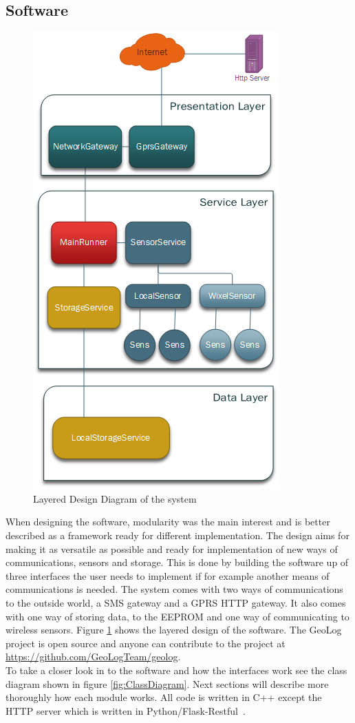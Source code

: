\subsection{Software}
\begin{figure}
\centering
\includegraphics[width=0.6\linewidth]{graphics/Layering}
\caption{Layered Design Diagram of the system\label{fig:Layering}}
\end{figure}
When designing the software, modularity was the main interest and is better described as
a framework ready for different implementation. The design aims for making
it as versatile as possible and ready for implementation of new ways of communications, sensors and storage. This is done by building the software up of three interfaces the user needs to implement if for example another means of communications is needed. The system comes with two ways of communications to the outside world, a SMS gateway and a GPRS HTTP gateway. It also comes with one way of storing data, to the EEPROM and one way of communicating to wireless sensors. Figure \ref{fig:Layering} shows the layered design of the software. The GeoLog project is open source and anyone can contribute
to the project at \url{https://github.com/GeoLogTeam/geolog}.\\
To take a closer look in to the software and how the interfaces work see the class diagram
shown in figure \ref{fig:ClassDiagram}. Next sections will describe more thoroughly how each module works. All code is written in C++ except the HTTP server which is written in Python/Flask-Restful~\cite{Flask}.

